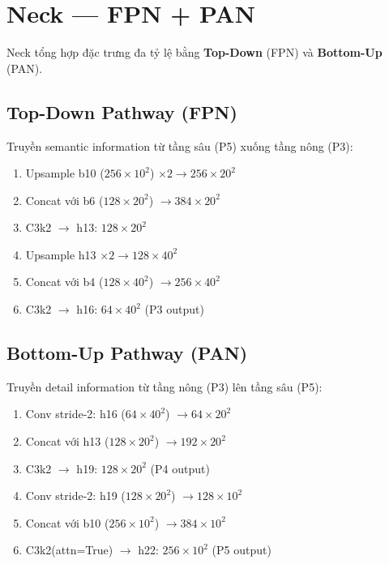 \section{Neck --- FPN + PAN}
\label{sec:neck}

Neck tổng hợp đặc trưng đa tỷ lệ bằng \textbf{Top-Down} (FPN) và \textbf{Bottom-Up} (PAN).

\subsection{Top-Down Pathway (FPN)}

Truyền semantic information từ tầng sâu (P5) xuống tầng nông (P3):

\begin{enumerate}
    \item Upsample b10 ($256 \times 10^2$) $\times 2 \to 256 \times 20^2$
    \item Concat với b6 ($128 \times 20^2$) $\to 384 \times 20^2$
    \item C3k2 $\to$ h13: $128 \times 20^2$
    \item Upsample h13 $\times 2 \to 128 \times 40^2$
    \item Concat với b4 ($128 \times 40^2$) $\to 256 \times 40^2$
    \item C3k2 $\to$ h16: $64 \times 40^2$ \quad (P3 output)
\end{enumerate}

\subsection{Bottom-Up Pathway (PAN)}

Truyền detail information từ tầng nông (P3) lên tầng sâu (P5):

\begin{enumerate}
    \item Conv stride-2: h16 ($64 \times 40^2$) $\to 64 \times 20^2$
    \item Concat với h13 ($128 \times 20^2$) $\to 192 \times 20^2$
    \item C3k2 $\to$ h19: $128 \times 20^2$ \quad (P4 output)
    \item Conv stride-2: h19 ($128 \times 20^2$) $\to 128 \times 10^2$
    \item Concat với b10 ($256 \times 10^2$) $\to 384 \times 10^2$
    \item C3k2(attn=True) $\to$ h22: $256 \times 10^2$ \quad (P5 output)
\end{enumerate}

